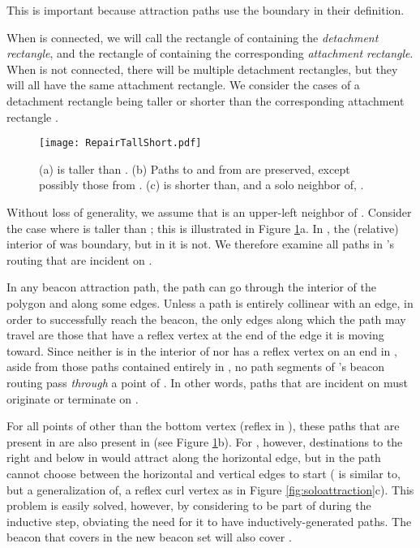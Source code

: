 \documentclass{article}
\begin{document}
	This is important because attraction paths use the boundary in their
	definition.
	
	When  is connected, we will call the rectangle of  containing
	 the \emph{detachment rectangle}, and the rectangle of  containing 
	the corresponding \emph{attachment rectangle}.
	When  is not connected, there will be multiple detachment rectangles,
	but they will all have the same attachment rectangle.
	We consider
	the cases of a detachment rectangle  being taller or shorter
	than the corresponding attachment rectangle .
	
	\begin{figure}[htbp] 
		\begin{center}
		    \texttt{[image: RepairTallShort.pdf]} 
		\end{center}
		\caption{
		    (a)  is taller than .
		    (b) Paths to and from  are preserved, except possibly those from .
		    (c)  is shorter than, and a solo neighbor of, .
		}
		\label{fig:repairtallshort}
	\end{figure}
		
	Without loss of generality, we assume that  is an upper-left neighbor of
	.  Consider the case where  is taller than ; this is illustrated in
	Figure \ref{fig:repairtallshort}a.
	In , the (relative) interior of  was boundary, but in  it is
	not.  We therefore examine all paths in 's routing that are incident
	on .
	 
	In any beacon attraction path, the path can go through the interior of the
	polygon and along some edges.
	Unless a path is entirely collinear with an edge, in order to successfully
	reach the beacon, the only edges along which the path may travel are those
	that have a reflex vertex at the end of the edge it is moving toward.
	Since  neither is in the
	interior of  nor has a reflex vertex on an end in , 
	aside from those paths contained entirely in , no path segments of
	's beacon routing pass \emph{through} a point of .
	In other words, paths that are incident on  must originate
	or terminate on .
	
	For all points of  other than the bottom  vertex  (reflex in ),
	these paths that are present in  are also present in  (see Figure
	\ref{fig:repairtallshort}b).  For , however, destinations to the right
	and below in  would attract along the horizontal edge, but in 
	the path cannot choose between the horizontal and vertical edges to start
	( is similar to, but a generalization of, a reflex curl vertex as in Figure \ref{fig:soloattraction}c).
	This problem is easily solved, however, by considering  to be part of 
	during the inductive step, obviating the need for it to have
	inductively-generated paths.  The beacon that covers  in the new beacon set
	will also cover .
\end{document}
